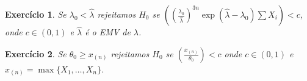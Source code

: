 \documentclass[letter,11pt]{article}
\newtheorem{exer}{Exercício}
\begin{document}
\begin{exer} \rm 
Se $\lambda_0 < \hat{\lambda}$ rejeitamos $H_0$ se $\left(\left(\frac{\lambda_0}{\hat{\lambda}}\right)^{3n}\exp{(\hat{\lambda}-\lambda_0)\sum X_i}\right)< c$, onde $c \in (0,1)$ e $\hat{\lambda}$ é o EMV de $\lambda$.
\end{exer}


\begin{exer} \rm 
% 
Se $\theta_0 \geq x_{(n)}$ rejeitamos $H_0$ se $\left(\frac{x_{(n)}}{\theta_0}\right) < c$ onde $c \in (0,1)$ e $x_{(n)}=\max\{X_1, \ldots, X_n\}$.
\end{exer}

\end{document}
